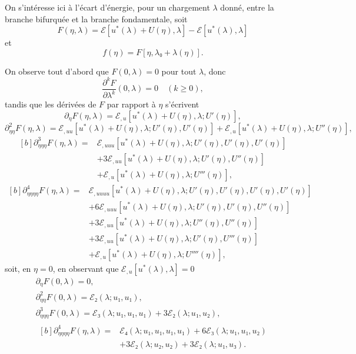 \documentclass[12pt, final]{amsart}
\theoremstyle{definition}
\begin{document}
On s'intéresse ici à l'écart d'énergie, pour un chargement \(λ\) donné, entre la
branche bifurquée et la branche fondamentale, soit
\begin{equation}
  F(η, λ) = ℰ[u^{\ast}(λ) + U(η), λ] - ℰ[u^{\ast}(λ), λ]
\end{equation}
et
\begin{equation}
  f(η) = F [η, λ₀ + λ(η)].
\end{equation}

On observe tout d'abord que \(F(0, λ) = 0\) pour tout \(λ\), donc
\begin{equation}
  \frac{∂^k F}{∂ λ^k}(0, λ) = 0 \quad (k ≥ 0),
\end{equation}
tandis que les dérivées de \(F\) par rapport à \(η\) s'écrivent
\begin{equation}
  ∂_{η} F(η, λ) = ℰ_{, u}[u^{\ast}(λ) + U(η), λ; U'(η)],
\end{equation}
\begin{equation}
  ∂_{ηη}^2 F(η, λ) = ℰ_{, uu} [u^{\ast}(λ) + U(η), λ; U'(η), U'(η)] + ℰ_{, u} [u^{\ast}(λ) + U(η), λ; U''(η)],
\end{equation}
\begin{equation*}
  \begin{aligned}[b]
    ∂_{ηηη}^3 F(η, λ) ={}
    & ℰ_{, uuu} [u^{\ast}(λ) + U(η), λ; U'(η), U'(η), U'(η)]\\
    & + 3ℰ_{, uu}[u^{\ast}(λ) + U(η), λ; U'(η), U''(η)]\\
    & + ℰ_{, u}[u^{\ast}(λ) + U(η), λ; U'''(η)],
  \end{aligned}
\end{equation*}
\begin{equation}
  \begin{aligned}[b]
    ∂_{ηηηη}^4 F(η, λ) ={}
    & ℰ_{, uuuu}[u^{\ast}(λ) + U(η), λ; U'(η), U'(η), U'(η), U'(η)]\\
    & + 6ℰ_{,uuu}[u^{\ast}(λ) + U(η), λ; U'(η), U'(η), U''(η)]\\
    & + 3ℰ_{, uu}[u^{\ast}(λ) + U(η), λ; U''(η), U''(η)]\\
    & + 3ℰ_{, uu}[u^{\ast}(λ) + U(η), λ; U'(η), U'''(η)]\\
    & +ℰ_{, u}[u^{\ast}(λ) + U(η), λ ; U''''(η)],
  \end{aligned}
\end{equation}
soit, en \(η = 0\), en observant que \(ℰ_{, u}[u^{\ast}(λ), λ] = 0\)
\begin{gather}
  ∂_{η} F(0, λ) = 0,\\
  ∂_{ηη}^2 F(0, λ) =ℰ₂(λ ; u₁, u₁),\\
  ∂_{ηηη}^3 F(0, λ) = ℰ₃(λ; u₁, u₁, u₁) + 3ℰ₂(λ; u₁, u₂),\\
  \begin{aligned}[b]
    ∂_{ηηηη}^4 F(η, λ) ={}
    & ℰ₄(λ; u₁, u₁, u₁, u₁) + 6ℰ₃(λ; u₁, u₁, u₂)\\
    & + 3ℰ₂(λ; u₂, u₂) + 3ℰ₂(λ; u₁, u₃).
  \end{aligned}
\end{gather}
\end{document}

